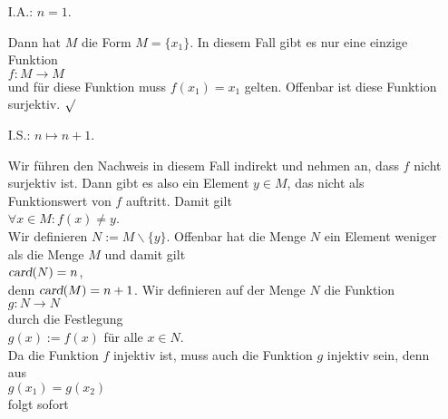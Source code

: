 \begin{enumerate}
\item[I.A.:] $n = 1$.

             Dann hat $M$ die Form $M = \{ x_1 \}$.  In diesem Fall gibt es nur eine einzige Funktion
             \\[0.2cm]
             \hspace*{1.3cm}
             $f: M \rightarrow M$
             \\[0.2cm]
             und f\"{u}r diese Funktion muss $f(x_1) = x_1$ gelten.  Offenbar ist diese Funktion 
             surjektiv. $\surd$
\item[I.S.:] $n \mapsto n+1$.

             Wir f\"{u}hren den Nachweis in diesem Fall indirekt und nehmen an, dass $f$ nicht
             surjektiv ist.  Dann gibt es also ein Element $y \in M$, das nicht als Funktionswert
             von $f$ auftritt.  Damit gilt 
             \\[0.2cm]
             \hspace*{1.3cm}
             $\forall x \in M: f(x) \not= y$.
             \\[0.2cm]
             Wir definieren  $N := M \backslash \{ y \}$.  Offenbar hat die Menge $N$
             ein Element weniger als die Menge $M$ und damit gilt
             \\[0.2cm]
             \hspace*{1.3cm}
             $\textsl{card}(N) = n$,
             \\[0.2cm]
             denn $\textsl{card}(M) = n+1$.  Wir definieren auf der Menge $N$ die Funktion
             \\[0.2cm]
             \hspace*{1.3cm}
             $g:N \rightarrow N$
             \\[0.2cm]
             durch die Festlegung
             \\[0.2cm]
             \hspace*{1.3cm}
             $g(x) := f(x)$ \quad f\"{u}r alle $x \in N$.
             \\[0.2cm]
             Da die Funktion $f$ injektiv ist, muss auch die Funktion $g$ injektiv sein, denn aus
             \\[0.2cm]
             \hspace*{1.3cm}
             $g(x_1) = g(x_2)$
             \\[0.2cm]
             folgt sofort
             \\[0.2cm]

\end{enumerate}
